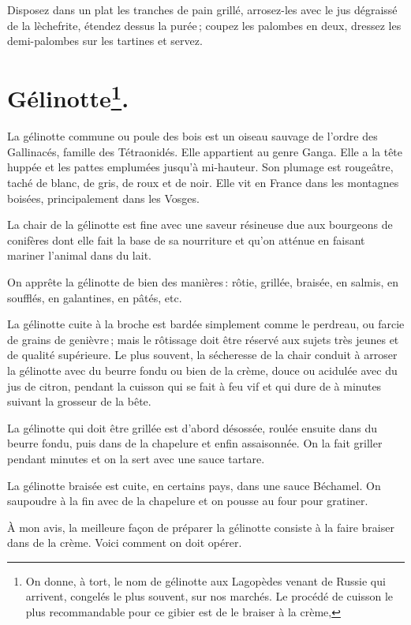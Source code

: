 Disposez dans un plat les tranches de pain grillé, arrosez-les avec le jus
dégraissé de la lèchefrite, étendez dessus la purée ; coupez les palombes en
deux, dressez les demi-palombes sur les tartines et servez.

\section*{\centering Gélinotte\footnote{On donne, à tort, le nom de gélinotte
aux Lagopèdes venant de Russie qui arrivent, congelés le plus souvent, sur nos
marchés.
\protect\endgraf
Le procédé de cuisson le plus recommandable pour ce gibier est de le braiser
à la crème,}.}
{}

La gélinotte commune ou poule des bois est un oiseau sauvage de l'ordre des
Gallinacés, famille des Tétraonidés. Elle appartient au genre Ganga. Elle a la
tête huppée et les pattes emplumées jusqu'à mi-hauteur. Son plumage est
rougeâtre, taché de blanc, de gris, de roux et de noir. Elle vit en France dans
les montagnes boisées, principalement dans les Vosges.

La chair de la gélinotte est fine avec une saveur résineuse due aux bourgeons
de conifères dont elle fait la base de sa nourriture et qu'on atténue en
faisant mariner l'animal dans du lait.

On apprête la gélinotte de bien des manières : rôtie, grillée, braisée, en
salmis, en soufflés, en galantines, en pâtés, etc.

La gélinotte cuite à la broche est bardée simplement comme le perdreau, ou
farcie de grains de genièvre ; mais le rôtissage doit être réservé aux sujets
très jeunes et de qualité supérieure. Le plus souvent, la sécheresse de la
chair conduit à arroser la gélinotte avec du beurre fondu ou bien de la crème,
douce ou acidulée avec du jus de citron, pendant la cuisson qui se fait à feu
vif et qui dure de {\mmm} à {\mmm} minutes suivant la grosseur de
la bête.

La gélinotte qui doit être grillée est d’abord désossée, roulée ensuite dans du
beurre fondu, puis dans de la chapelure et enfin assaisonnée. On la fait
griller pendant {\mmm} minutes et on la sert avec une sauce tartare.

La gélinotte braisée est cuite, en certains pays, dans une sauce Béchamel. On
saupoudre à la fin avec de la chapelure et on pousse au four pour gratiner.

À mon avis, la meilleure façon de préparer la gélinotte consiste à la faire
braiser dans de la crème. Voici comment on doit opérer.

